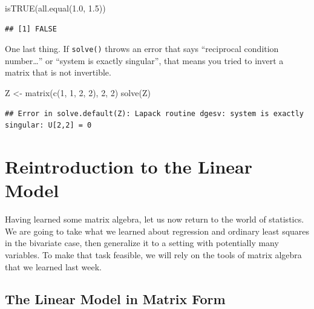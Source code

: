 \documentclass[
  12pt,
  oneside,openany]{book}
\newenvironment{Shaded}{\begin{snugshade}}{\end{snugshade}}
\newcommand{\DecValTok}[1]{\textcolor[rgb]{0.00,0.00,0.81}{#1}}
\newcommand{\FloatTok}[1]{\textcolor[rgb]{0.00,0.00,0.81}{#1}}
\newcommand{\FunctionTok}[1]{\textcolor[rgb]{0.00,0.00,0.00}{#1}}
\newcommand{\NormalTok}[1]{#1}
\newcommand{\OtherTok}[1]{\textcolor[rgb]{0.56,0.35,0.01}{#1}}
\begin{document}
\begin{Shaded}
\begin{Highlighting}[]
\FunctionTok{isTRUE}\NormalTok{(}\FunctionTok{all.equal}\NormalTok{(}\FloatTok{1.0}\NormalTok{, }\FloatTok{1.5}\NormalTok{))}
\end{Highlighting}
\end{Shaded}

\begin{verbatim}
## [1] FALSE
\end{verbatim}

One last thing. If \texttt{solve()} throws an error that says ``reciprocal condition number\ldots{}'' or ``system is exactly singular'', that means you tried to invert a matrix that is not invertible.

\begin{Shaded}
\begin{Highlighting}[]
\NormalTok{Z }\OtherTok{\textless{}{-}} \FunctionTok{matrix}\NormalTok{(}\FunctionTok{c}\NormalTok{(}\DecValTok{1}\NormalTok{, }\DecValTok{1}\NormalTok{, }\DecValTok{2}\NormalTok{, }\DecValTok{2}\NormalTok{), }\DecValTok{2}\NormalTok{, }\DecValTok{2}\NormalTok{)}
\FunctionTok{solve}\NormalTok{(Z)}
\end{Highlighting}
\end{Shaded}

\begin{verbatim}
## Error in solve.default(Z): Lapack routine dgesv: system is exactly singular: U[2,2] = 0
\end{verbatim}

\hypertarget{ols-matrix}{%
\chapter{Reintroduction to the Linear Model}\label{ols-matrix}}

\newcommand{\OLS}{\text{OLS}}

Having learned some matrix algebra, let us now return to the world of statistics. We are going to take what we learned about regression and ordinary least squares in the bivariate case, then generalize it to a setting with potentially many variables. To make that task feasible, we will rely on the tools of matrix algebra that we learned last week.

\hypertarget{the-linear-model-in-matrix-form}{%
\section{The Linear Model in Matrix Form}\label{the-linear-model-in-matrix-form}}
\end{document}
